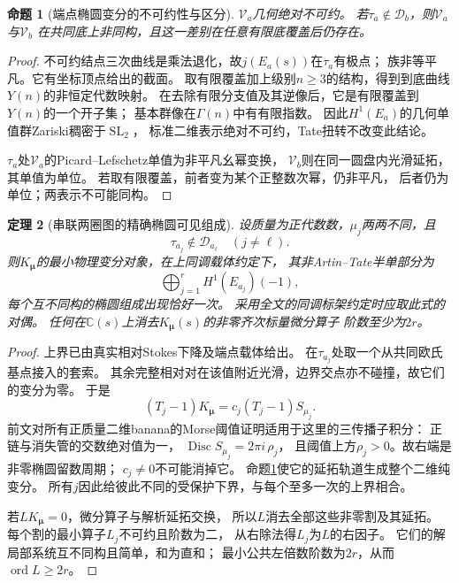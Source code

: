 \documentclass[11pt,a4paper]{ctexart}
\theoremstyle{cnplain}\newtheorem{theorem}{定理}[section]
\newtheorem{proposition}[theorem]{命题}
\theoremstyle{definition}\newtheorem{definition}[theorem]{定义}
\theoremstyle{remark}\newtheorem{remark}[theorem]{注}
\begin{document}
\begin{proposition}[端点椭圆变分的不可约性与区分]\label{prop:seriesirred}
$\mathcal V_a$几何绝对不可约。
若$\tau_a\notin\mathcal D_b$，则$\mathcal V_a$与$\mathcal V_b$
在共同底上非同构，且这一差别在任意有限底覆盖后仍存在。
\end{proposition}
\begin{proof}
不可约结点三次曲线是乘法退化，故$j(E_a(s))$在$\tau_a$有极点；
族非等平凡。它有坐标顶点给出的截面。
取有限覆盖加上级别$n\ge3$的结构，得到到底曲线$Y(n)$的非恒定代数映射。
在去除有限分支值及其逆像后，它是有限覆盖到$Y(n)$的一个开子集；
基本群像在$\Gamma(n)$中有有限指数。
因此$H^1(E_a)$的几何单值群Zariski稠密于$\operatorname{SL}_2$，
标准二维表示绝对不可约，Tate扭转不改变此结论。

$\tau_a$处$\mathcal V_a$的Picard--Lefschetz单值为非平凡幺幂变换，
$\mathcal V_b$则在同一圆盘内光滑延拓，其单值为单位。
若取有限覆盖，前者变为某个正整数次幂，仍非平凡，
后者仍为单位；两表示不可能同构。
\end{proof}

\begin{theorem}[串联两圈图的精确椭圆可见组成]\label{thm:seriesvisible}
设质量为正代数数，$\mu_j$两两不同，且
\begin{equation}\label{eq:seriesseparation}
 \tau_{a_j}\notin\mathcal D_{a_\ell}\quad(j\ne\ell).
\end{equation}
则$K_{\boldsymbol\mu}$的最小物理变分对象，在上同调载体约定下，
其非Artin--Tate半单部分为
\[
 \bigoplus_{j=1}^r H^1(E_{a_j})(-1),
\]
每个互不同构的椭圆组成出现恰好一次。
采用全文的同调标架约定时应取此式的对偶。
任何在$\mathbb C(s)$上消去$K_{\boldsymbol\mu}(s)$的非零齐次标量微分算子
阶数至少为$2r$。
\end{theorem}
\begin{proof}
上界已由真实相对Stokes下降及端点载体给出。
在$\tau_{a_j}$处取一个从共同欧氏基点接入的套索。
其余完整相对对在该值附近光滑，边界交点亦不碰撞，故它们的变分为零。
于是
\[
 (T_j-1)K_{\boldsymbol\mu}
      =c_j(T_j-1)S_{\mu_j}.
\]
前文对所有正质量二维banana的Morse阈值证明适用于这里的三传播子积分：
正链与消失管的交数绝对值为一，
$\operatorname{Disc}S_{\mu_j}=2\pi i\,\rho_j$，
且阈值上方$\rho_j>0$。故右端是非零椭圆留数周期；
$c_j\ne0$不可能消掉它。
命题\ref{prop:seriesirred}使它的延拓轨道生成整个二维纯变分。
所有$j$因此给彼此不同的受保护下界，与每个至多一次的上界相合。

若$LK_{\boldsymbol\mu}=0$，微分算子与解析延拓交换，
所以$L$消去全部这些非零割及其延拓。
每个割的最小算子$L_j$不可约且阶数为二，
从右除法得$L_j$为$L$的右因子。
它们的解局部系统互不同构且简单，和为直和；
最小公共左倍数阶数为$2r$，从而$\operatorname{ord}L\ge2r$。
\end{proof}
\end{document}
